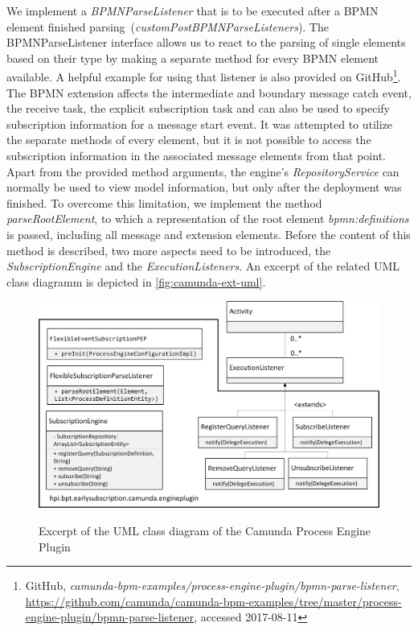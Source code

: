 We implement a \textit{BPMNParseListener} that is to be executed after a BPMN element finished parsing~(\textit{customPostBPMNParseListeners}).
The BPMNParseListener interface allows us to react to the parsing of single elements based on their type by making a separate method for every BPMN element available.
A helpful example for using that listener is also provided on GitHub\footnote{GitHub, \textit{camunda-bpm-examples/process-engine-plugin/bpmn-parse-listener}, \url{https://github.com/camunda/camunda-bpm-examples/tree/master/process-engine-plugin/bpmn-parse-listener}, accessed 2017-08-11}.
The BPMN extension affects the intermediate and boundary message catch event, the receive task, the explicit subscription task and can also be used to specify subscription information for a message start event.
It was attempted to utilize the separate methods of every element, but it is not possible to access the subscription information in the associated message elements from that point. Apart from the provided method arguments, the engine's \textit{RepositoryService} can normally be used to view model information, but only after the deployment was finished.  
To overcome this limitation, we implement the method \textit{parseRootElement}, to which a representation of the root element \textit{bpmn:definitions} is passed, including all message and extension elements. 
Before the content of this method is described, two more aspects need to be introduced, the \textit{SubscriptionEngine} and the \textit{ExecutionListeners}. An excerpt of the related UML class diagramm is depicted in \autoref{fig:camunda-ext-uml}.

\begin{figure}[]
	\myfloatalign
	{\includegraphics[width=1.0\linewidth]{chapters/implementation/uml-camunda-ext.png}}
	\caption{Excerpt of the UML class diagram of the Camunda Process Engine Plugin}
	\label{fig:camunda-ext-uml}
\end{figure}


